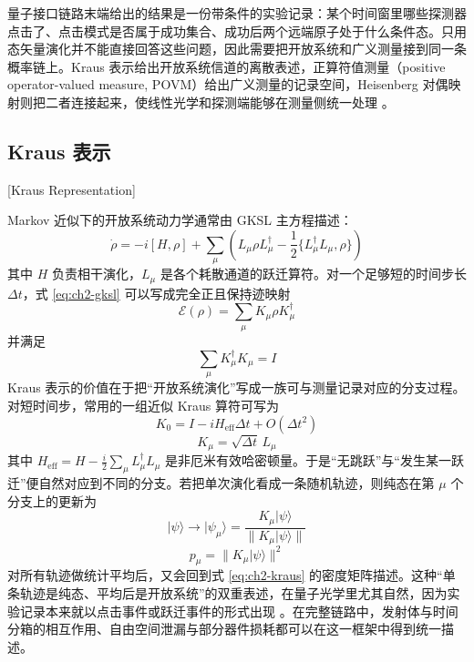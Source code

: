 量子接口链路末端给出的结果是一份带条件的实验记录：某个时间窗里哪些探测器点击了、点击模式是否属于成功集合、成功后两个远端原子处于什么条件态。只用态矢量演化并不能直接回答这些问题，因此需要把开放系统和广义测量接到同一条概率链上。Kraus 表示给出开放系统信道的离散表述，正算符值测量（positive operator-valued measure, POVM）给出广义测量的记录空间，Heisenberg 对偶映射则把二者连接起来，使线性光学和探测端能够在测量侧统一处理 \cite{Kraus1983StatesEffectsOperations,Lindblad1976Semigroups,GoriniKossakowskiSudarshan1976,NielsenChuang2010QCQI}。

\subsection{Kraus 表示}[Kraus Representation]

Markov 近似下的开放系统动力学通常由 GKSL 主方程描述：
\begin{equation}
\dot\rho=-i[H,\rho]+\sum_{\mu}\left(L_{\mu}\rho L_{\mu}^{\dagger}-\frac{1}{2}\{L_{\mu}^{\dagger}L_{\mu},\rho\}\right)
\label{eq:ch2-gksl}
\end{equation}
其中 $H$ 负责相干演化，$L_{\mu}$ 是各个耗散通道的跃迁算符。对一个足够短的时间步长 $\Delta t$，式 \eqref{eq:ch2-gksl} 可以写成完全正且保持迹映射
\begin{equation}
\mathcal E(\rho)=\sum_{\mu}K_{\mu}\rho K_{\mu}^{\dagger}
\label{eq:ch2-kraus}
\end{equation}
并满足
\begin{equation}
\sum_{\mu}K_{\mu}^{\dagger}K_{\mu}=I
\label{eq:ch2-kraus-complete}
\end{equation}
Kraus 表示的价值在于把“开放系统演化”写成一族可与测量记录对应的分支过程。对短时间步，常用的一组近似 Kraus 算符可写为
\begin{equation}
K_0=I-iH_{\mathrm{eff}}\Delta t+O(\Delta t^2)
\label{eq:ch2-short-time-kraus-0}
\end{equation}
\begin{equation}
K_{\mu}=\sqrt{\Delta t}\,L_{\mu}
\label{eq:ch2-short-time-kraus-mu}
\end{equation}
其中 $H_{\mathrm{eff}}=H-\frac{i}{2}\sum_{\mu}L_{\mu}^{\dagger}L_{\mu}$ 是非厄米有效哈密顿量。于是“无跳跃”与“发生某一跃迁”便自然对应到不同的分支。若把单次演化看成一条随机轨迹，则纯态在第 $\mu$ 个分支上的更新为
\begin{equation}
|\psi\rangle\rightarrow |\psi_{\mu}\rangle=
\frac{K_{\mu}|\psi\rangle}{\|K_{\mu}|\psi\rangle\|}
\label{eq:ch2-trajectory-state}
\end{equation}
\begin{equation}
p_{\mu}=\|K_{\mu}|\psi\rangle\|^2
\label{eq:ch2-trajectory-prob}
\end{equation}
对所有轨迹做统计平均后，又会回到式 \eqref{eq:ch2-kraus} 的密度矩阵描述。这种“单条轨迹是纯态、平均后是开放系统”的双重表述，在量子光学里尤其自然，因为实验记录本来就以点击事件或跃迁事件的形式出现 \cite{DalibardCastinMolmer1992QuantumJumps,Daley2014QuantumTrajectories}。在完整链路中，发射体与时间分箱的相互作用、自由空间泄漏与部分器件损耗都可以在这一框架中得到统一描述。

